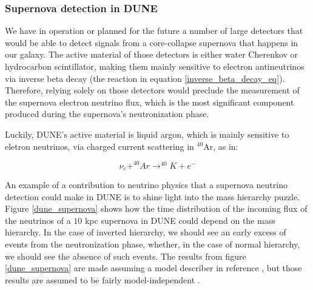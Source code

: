 \subsubsection{Supernova detection in DUNE}

We have in operation or planned for the future a number of large detectors that would be able to detect signals from a core-collapse supernova that happens in our galaxy. The active material of those detectors is either water Cherenkov or hydrocarbon scintillator, making them mainly sensitive to electron antineutrinos via inverse beta decay (the reaction in equation \ref{inverse_beta_decay_eq}). 
Therefore, relying solely on those detectors would preclude the measurement of the supernova electron neutrino flux, which is the most significant component produced during the supernova's neutronization phase. 

Luckily, DUNE's active material is liquid argon, which is mainly sensitive to eletron neutrinos, via charged current scattering in $^{40}$Ar, as in:

\begin{equation}
    \nu_e + ^{40}Ar \longrightarrow ^{40}K + e^{-}
    \label{nu_scatter_eq}
\end{equation}
 
An example of a contribution to neutrino physics that a supernova neutrino detection could make in DUNE is to shine light into the mass hierarchy puzzle. Figure \ref{dune_supernova} shows how the time distribution of the incoming flux of the neutrinos of a $10$ kpc supernova in DUNE could depend on the mass hierarchy. In the case of inverted hierarchy, we should see an early excess of events from the neutronization phase, whether, in the case of normal hierarchy, we should see the absence of such events. The results from figure \ref{dune_supernova} are made assuming a model describer in reference \cite{dune_supernova_model}, but those results are assumed to be fairly model-independent \cite{kate_scholberg}. 

